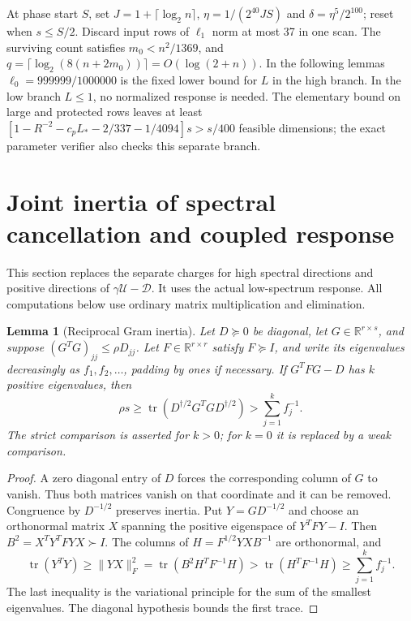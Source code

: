 \documentclass[11pt]{amsart}
\newtheorem{lemma}[theorem]{Lemma}
\theoremstyle{remark}\newtheorem{remark}[theorem]{Remark}
\newcommand{\R}{\mathbb R}
\begin{document}
At phase start $S$, set $J=1+\lceil\log_2 n\rceil$,
$\eta=1/(2^{40}JS)$ and $\delta=\eta^5/2^{100}$; reset when
$s\le S/2$. Discard input rows of $\ell_1$ norm at most 37 in one scan.
The surviving count satisfies $m_0<n^2/1369$, and
$q=\lceil\log_2(8(n+2m_0))\rceil=O(\log(2+n))$.
In the following lemmas $\ell_0=999999/1000000$ is the fixed lower bound
for $L$ in the high branch. In the low branch $L\le1$, no normalized response is needed.
The elementary bound on large and protected rows leaves at least
$[1-R^{-2}-c_pL_*-2/337-1/4094]s>s/400$ feasible dimensions;
the exact parameter verifier also checks this separate branch.

\section{Joint inertia of spectral cancellation and coupled response}

This section replaces the separate charges for high spectral directions
and positive directions of $\gamma\mathcal U-\mathcal D$.
It uses the actual low-spectrum response. All computations below use
ordinary matrix multiplication and elimination.

\begin{lemma}[Reciprocal Gram inertia]
Let $D\succeq0$ be diagonal, let $G\in\R^{r\times s}$, and suppose
$(G^TG)_{jj}\le\rho D_{jj}$. Let $F\in\R^{r\times r}$ satisfy $F\succeq I$,
and write its eigenvalues decreasingly as $f_1,f_2,\ldots$, padding by ones
if necessary. If $G^TFG-D$ has $k$ positive eigenvalues, then
\[
 \rho s\ge\operatorname{tr}(D^{\dagger/2}G^TG D^{\dagger/2})
 >\sum_{j=1}^k f_j^{-1}.
\]
The strict comparison is asserted for $k>0$; for $k=0$ it is replaced
by a weak comparison.
\end{lemma}
\begin{proof}
A zero diagonal entry of $D$ forces the corresponding column of $G$ to
vanish. Thus both matrices vanish on that coordinate and it can be removed.
Congruence by $D^{-1/2}$ preserves inertia. Put $Y=GD^{-1/2}$ and choose an
orthonormal matrix $X$ spanning the positive eigenspace of $Y^TFY-I$.
Then $B^2=X^TY^TFYX\succ I$. The columns of
$H=F^{1/2}YX B^{-1}$ are orthonormal, and
\[
 \operatorname{tr}(Y^TY)\ge\|YX\|_F^2
 =\operatorname{tr}(B^2 H^TF^{-1}H)
 >\operatorname{tr}(H^TF^{-1}H)
 \ge\sum_{j=1}^k f_j^{-1}.
\]
The last inequality is the variational principle for the sum of the
smallest eigenvalues. The diagonal hypothesis bounds the first trace.
\end{proof}
\end{document}
